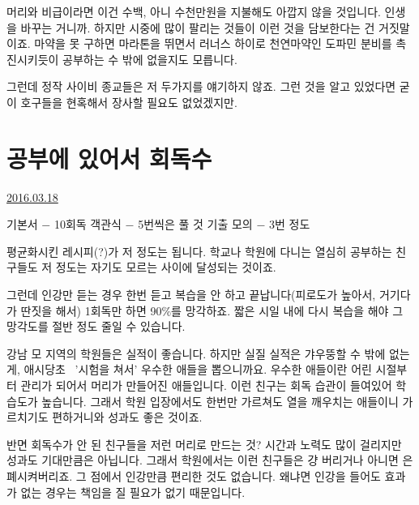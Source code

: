 머리와 비급이라면 이건 수백, 아니 수천만원을 지불해도 아깝지 않을 것입니다. 인생을 바꾸는 거니까.
하지만 시중에 많이 팔리는 것들이 이런 것을 담보한다는 건 거짓말이죠.
마약을 못 구하면 마라톤을 뛰면서 러너스 하이로 천연마약인 도파민 분비를 촉진시키듯이 공부하는 수 밖에 없을지도 모릅니다.
\vspace{5mm}

그런데 정작 사이비 종교들은 저 두가지를 얘기하지 않죠.
그런 것을 알고 있었다면 굳이 호구들을 현혹해서 장사할 필요도 없었겠지만.
\vspace{5mm}







\section{공부에 있어서 회독수}
\href{https://www.kockoc.com/Apoc/682149}{2016.03.18}

\vspace{5mm}

기본서 $-$ 10회독
객관식 $-$ 5번씩은 풀 것
기출 모의 $-$ 3번 정도
\vspace{5mm}

평균화시킨 레시피(?)가 저 정도는 됩니다.
학교나 학원에 다니는 열심히 공부하는 친구들도 저 정도는 자기도 모르는 사이에 달성되는 것이죠.
\vspace{5mm}

그런데 인강만 듣는 경우 한번 듣고 복습을 안 하고 끝납니다(피로도가 높아서, 거기다가 딴짓을 해서)
1회독만 하면 90$\%$를 망각하죠. 짧은 시일 내에 다시 복습을 해야 그 망각도를 절반 정도 줄일 수 있습니다.
\vspace{5mm}

강남 모 지역의 학원들은 실적이 좋습니다. 하지만 실질 실적은 갸우뚱할 수 밖에 없는 게, 애시당초  '시험을 쳐서' 우수한 애들을 뽑으니까요.
우수한 애들이란 어린 시절부터 관리가 되어서 머리가 만들어진 애들입니다. 이런 친구는 회독 습관이 들여있어 학습도가 높습니다.
그래서 학원 입장에서도 한번만 가르쳐도 열을 깨우치는 애들이니 가르치기도 편하거니와 성과도 좋은 것이죠.
\vspace{5mm}

반면 회독수가 안 된 친구들을 저런 머리로 만드는 것?
시간과 노력도 많이 걸리지만 성과도 기대만큼은 아닙니다. 그래서 학원에서는 이런 친구들은 걍 버리거나 아니면 은폐시켜버리죠.
그 점에서 인강만큼 편리한 것도 없습니다. 왜냐면 인강을 들어도 효과가 없는 경우는 책임을 질 필요가 없기 때문입니다.
\vspace{5mm}


